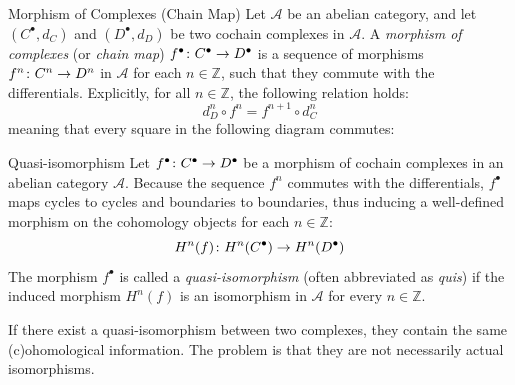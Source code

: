 \documentclass[a4paper]{article}
\begin{document}
\begin{snippetdefinition}{Morphism of Complexes (Chain Map)}
    Let \(\mathcal A\) be an abelian category, and let \((C^\bullet, d_C)\) and \((D^\bullet, d_D)\) be two cochain complexes in \(\mathcal A\).
    A \emph{morphism of complexes} (or \emph{chain map}) \(f^\bullet \colon C^\bullet \to D^\bullet\) is a sequence of morphisms \(f^n \colon C^n \to D^n\) in \(\mathcal A\) for each \(n \in \mathbb{Z}\), such that they commute with the differentials. 
    Explicitly, for all \(n \in \mathbb{Z}\), the following relation holds:
    \[
        d_D^n \circ f^n = f^{n+1} \circ d_C^n
    \]
    meaning that every square in the following diagram commutes:
    \begin{center}
    \end{center}
\end{snippetdefinition}

\begin{snippetdefinition}{Quasi-isomorphism}
    Let \(f^\bullet \colon C^\bullet \to D^\bullet\) be a morphism of cochain complexes in an abelian category \(\mathcal A\).
    Because the sequence \(f^n\) commutes with the differentials, \(f^\bullet\) maps cycles to cycles and boundaries to boundaries, thus inducing a well-defined morphism on the cohomology objects for each \(n \in \mathbb{Z}\):
    \[
        H^n(f) \colon H^n(C^\bullet) \to H^n(D^\bullet)
    \]
    The morphism \(f^\bullet\) is called a \emph{quasi-isomorphism} (often abbreviated as \emph{quis}) if the induced morphism \(H^n(f)\) is an isomorphism in \(\mathcal A\) for every \(n \in \mathbb{Z}\).
\end{snippetdefinition}

If there exist a quasi-isomorphism between two
complexes, they contain the same (c)ohomological information.
The problem is that they are not necessarily actual isomorphisms.
\end{document}
